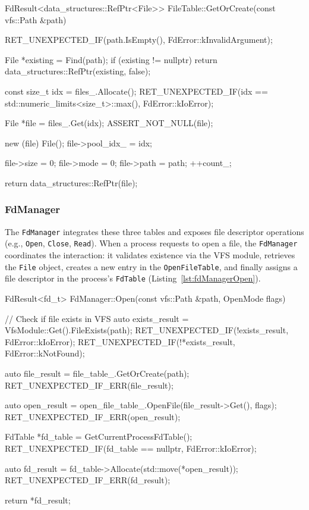 \documentclass[a4paper,10pt,twoside]{report}
\theoremstyle{definition}
\begin{document}
\begin{cppcode}[caption={FileTable GetOrCreate}, label={lst:fileTableGetOrCreate}]
FdResult<data_structures::RefPtr<File>> FileTable::GetOrCreate(const vfs::Path &path)
{
    RET_UNEXPECTED_IF(path.IsEmpty(), FdError::kInvalidArgument);

    File *existing = Find(path);
    if (existing != nullptr) {
        return data_structures::RefPtr(existing, false);
    }

    const size_t idx = files_.Allocate();
    RET_UNEXPECTED_IF(idx == std::numeric_limits<size_t>::max(), FdError::kIoError);

    File *file = files_.Get(idx);
    ASSERT_NOT_NULL(file);

    new (file) File();
    file->pool_idx_ = idx;

    file->size = 0;
    file->mode = 0;
    file->path = path;
    ++count_;

    return data_structures::RefPtr(file);
}
\end{cppcode}

\clearpage

\subsubsection{FdManager}
The \texttt{FdManager} integrates these three tables and exposes file descriptor operations (e.g., \texttt{Open}, \texttt{Close}, \texttt{Read}). When a process requests to open a file, the \texttt{FdManager} coordinates the interaction: it validates existence via the VFS module, retrieves the \texttt{File} object, creates a new entry in the \texttt{OpenFileTable}, and finally assigns a file descriptor in the process's \texttt{FdTable} (Listing~\ref{lst:fdManagerOpen}).

\begin{cppcode}[caption={FdManager Open Implementation}, label={lst:fdManagerOpen}]
FdResult<fd_t> FdManager::Open(const vfs::Path &path, OpenMode flags)
{
    // Check if file exists in VFS
    auto exists_result = VfsModule::Get().FileExists(path);
    RET_UNEXPECTED_IF(!exists_result, FdError::kIoError);
    RET_UNEXPECTED_IF(!*exists_result, FdError::kNotFound);

    auto file_result = file_table_.GetOrCreate(path);
    RET_UNEXPECTED_IF_ERR(file_result);

    auto open_result = open_file_table_.OpenFile(file_result->Get(), flags);
    RET_UNEXPECTED_IF_ERR(open_result);

    FdTable *fd_table = GetCurrentProcessFdTable();
    RET_UNEXPECTED_IF(fd_table == nullptr, FdError::kIoError);

    auto fd_result = fd_table->Allocate(std::move(*open_result));
    RET_UNEXPECTED_IF_ERR(fd_result);

    return *fd_result;
}
\end{cppcode}
\end{document}
